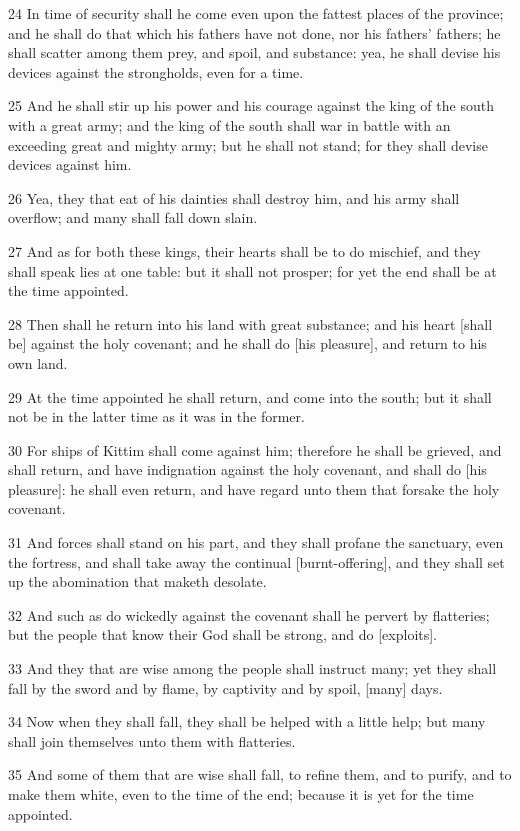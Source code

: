 \par 24 In time of security shall he come even upon the fattest places of the province; and he shall do that which his fathers have not done, nor his fathers' fathers; he shall scatter among them prey, and spoil, and substance: yea, he shall devise his devices against the strongholds, even for a time.
\par 25 And he shall stir up his power and his courage against the king of the south with a great army; and the king of the south shall war in battle with an exceeding great and mighty army; but he shall not stand; for they shall devise devices against him.
\par 26 Yea, they that eat of his dainties shall destroy him, and his army shall overflow; and many shall fall down slain.
\par 27 And as for both these kings, their hearts shall be to do mischief, and they shall speak lies at one table: but it shall not prosper; for yet the end shall be at the time appointed.
\par 28 Then shall he return into his land with great substance; and his heart [shall be] against the holy covenant; and he shall do [his pleasure], and return to his own land.
\par 29 At the time appointed he shall return, and come into the south; but it shall not be in the latter time as it was in the former.
\par 30 For ships of Kittim shall come against him; therefore he shall be grieved, and shall return, and have indignation against the holy covenant, and shall do [his pleasure]: he shall even return, and have regard unto them that forsake the holy covenant.
\par 31 And forces shall stand on his part, and they shall profane the sanctuary, even the fortress, and shall take away the continual [burnt-offering], and they shall set up the abomination that maketh desolate.
\par 32 And such as do wickedly against the covenant shall he pervert by flatteries; but the people that know their God shall be strong, and do [exploits].
\par 33 And they that are wise among the people shall instruct many; yet they shall fall by the sword and by flame, by captivity and by spoil, [many] days.
\par 34 Now when they shall fall, they shall be helped with a little help; but many shall join themselves unto them with flatteries.
\par 35 And some of them that are wise shall fall, to refine them, and to purify, and to make them white, even to the time of the end; because it is yet for the time appointed.
